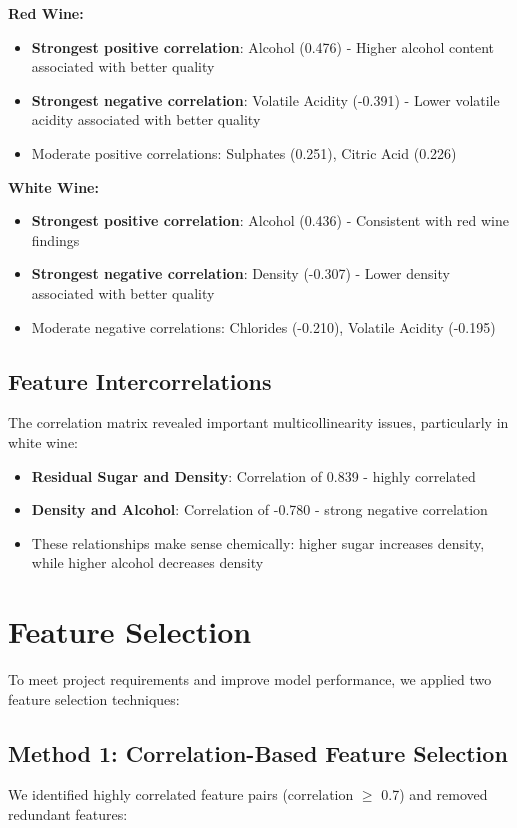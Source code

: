 \documentclass[12pt]{article}
\begin{document}
\textbf{Red Wine:}
\begin{itemize}
    \item \textbf{Strongest positive correlation}: Alcohol (0.476) - Higher alcohol content associated with better quality
    \item \textbf{Strongest negative correlation}: Volatile Acidity (-0.391) - Lower volatile acidity associated with better quality
    \item Moderate positive correlations: Sulphates (0.251), Citric Acid (0.226)
\end{itemize}

\textbf{White Wine:}
\begin{itemize}
    \item \textbf{Strongest positive correlation}: Alcohol (0.436) - Consistent with red wine findings
    \item \textbf{Strongest negative correlation}: Density (-0.307) - Lower density associated with better quality
    \item Moderate negative correlations: Chlorides (-0.210), Volatile Acidity (-0.195)
\end{itemize}

\subsection{Feature Intercorrelations}
The correlation matrix revealed important multicollinearity issues, particularly in white wine:
\begin{itemize}
    \item \textbf{Residual Sugar and Density}: Correlation of 0.839 - highly correlated
    \item \textbf{Density and Alcohol}: Correlation of -0.780 - strong negative correlation
    \item These relationships make sense chemically: higher sugar increases density, while higher alcohol decreases density
\end{itemize}

\section{Feature Selection}

To meet project requirements and improve model performance, we applied two feature selection techniques:

\subsection{Method 1: Correlation-Based Feature Selection}
We identified highly correlated feature pairs (correlation $\geq$ 0.7) and removed redundant features:
\end{document}
